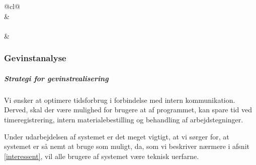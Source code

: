 \begin{table}[H]
{\begin{tabular}{@{}cl@{}}
                                                                                                                                                                                                                                                            \\ \midrule
{}                                                                                                &                                   \\ \midrule
{}                                                                                                                                                                               \\ \midrule
{} &  \\ \bottomrule
\end{tabular}
}
\end{table}

\subsubsection{Gevinstanalyse}
\subparagraph{Strategi for gevinstrealisering}
Vi ønsker at optimere tidsforbrug i forbindelse med intern kommunikation. Derved, skal der være mulighed for brugere at af programmet, kan spare tid ved timeregistrering, intern materialebestilling og behandling af arbejdstegninger.

Under udarbejdelsen af systemet er det meget vigtigt, at vi sørger for, at systemet er så nemt at bruge som muligt, da, som vi beskriver nærmere i afsnit \ref{interessent}, vil alle brugere af systemet være teknisk uerfarne.

